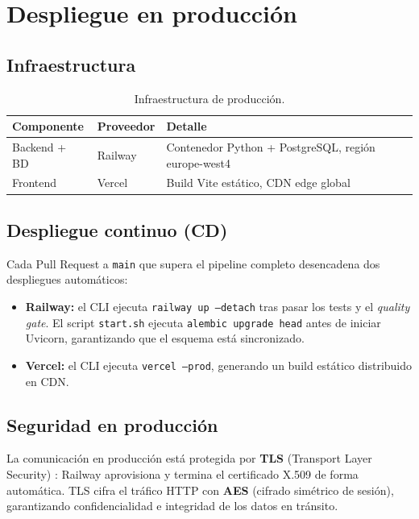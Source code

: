 \documentclass[12pt,twoside,titlepage]{report}
\begin{document}
\section{Despliegue en producción}

\subsection{Infraestructura}

\begin{table}[H]
  \centering
  \caption{Infraestructura de producción.}
  \label{tab:produccion}
  \begin{tabular}{lll}
    \toprule
    \textbf{Componente} & \textbf{Proveedor} & \textbf{Detalle} \\
    \midrule
    Backend + BD  & Railway \cite{railway}  & Contenedor Python + PostgreSQL, región europe-west4 \\
    Frontend      & Vercel \cite{vercel}    & Build Vite estático, CDN edge global \\
    \bottomrule
  \end{tabular}
\end{table}

\subsection{Despliegue continuo (CD)}

Cada Pull Request a \texttt{main} que supera el pipeline completo desencadena dos despliegues automáticos:
\begin{itemize}[nosep]
  \item \textbf{Railway:} el CLI ejecuta \texttt{railway up --detach} tras pasar los tests y el \emph{quality gate}. El script \texttt{start.sh} ejecuta \texttt{alembic upgrade head} antes de iniciar Uvicorn, garantizando que el esquema está sincronizado.
  \item \textbf{Vercel:} el CLI ejecuta \texttt{vercel --prod}, generando un build estático distribuido en CDN.
\end{itemize}

\subsection{Seguridad en producción}

La comunicación en producción está protegida por \textbf{TLS} (Transport Layer Security) \cite{kurose}: Railway aprovisiona y termina el certificado X.509 de forma automática. TLS cifra el tráfico HTTP con \textbf{AES} (cifrado simétrico de sesión), garantizando confidencialidad e integridad de los datos en tránsito.
\end{document}
